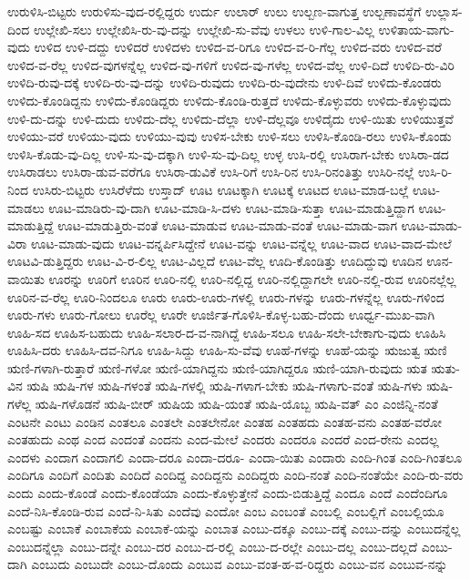 {ಉರುಳಿಸಿ-ಬಿಟ್ಟರು
ಉರುಳಿಸು-ವುದ-ರಲ್ಲಿದ್ದರು
ಉರ್ದು
ಉಲಾರ್
ಉಲು
ಉಲ್ಬಣ-ವಾಗುತ್ತ
ಉಲ್ಬಣಾವಸ್ಥೆಗೆ
ಉಲ್ಲಾಸ-ದಿಂದ
ಉಲ್ಲೇಖಿ-ಸಲು
ಉಲ್ಲೇಖಿಸಿ-ರು-ವು-ದನ್ನು
ಉಲ್ಲೇಖಿ-ಸು-ವೆವು
ಉಳಲು
ಉಳಿ-ಗಾಲ-ವಿಲ್ಲ
ಉಳಿತಾಯ-ವಾಗು-ವುದು
ಉಳಿದ
ಉಳಿ-ದದ್ದು
ಉಳಿದರೆ
ಉಳಿದಳು
ಉಳಿದ-ವ-ರಿಗೂ
ಉಳಿದ-ವ-ರಿ-ಗೆಲ್ಲ
ಉಳಿದ-ವರು
ಉಳಿದ-ವರೆ
ಉಳಿದ-ವ-ರೆಲ್ಲ
ಉಳಿದ-ವುಗಳನ್ನೆಲ್ಲ
ಉಳಿದ-ವು-ಗಳಿಗೆ
ಉಳಿದ-ವು-ಗಳೆಲ್ಲ
ಉಳಿದ-ವೆಲ್ಲ
ಉಳಿ-ದಿದೆ
ಉಳಿದಿ-ರು-ವಿರಿ
ಉಳಿದಿ-ರುವು-ದಕ್ಕೆ
ಉಳಿದಿ-ರು-ವು-ದನ್ನು
ಉಳಿದಿ-ರುವುದು
ಉಳಿದಿ-ರು-ವುದೇನು
ಉಳಿ-ದಿವೆ
ಉಳಿದು-ಕೊಂಡರು
ಉಳಿದು-ಕೊಂಡಿದ್ದನು
ಉಳಿದು-ಕೊಂಡಿದ್ದರು
ಉಳಿದು-ಕೊಂಡಿ-ರುತ್ತದೆ
ಉಳಿದು-ಕೊಳ್ಳುವರು
ಉಳಿದು-ಕೊಳ್ಳುವುದು
ಉಳಿ-ದು-ದನ್ನು
ಉಳಿ-ದುದು
ಉಳಿದು-ದೆಲ್ಲ
ಉಳಿದು-ದೆಲ್ಲಾ
ಉಳಿ-ದೆಲ್ಲವೂ
ಉಳಿದೈದು
ಉಳಿ-ಯಿತು
ಉಳಿಯುತ್ತವೆ
ಉಳಿಯು-ವರೆ
ಉಳಿಯು-ವುದು
ಉಳಿಯು-ವುವು
ಉಳಿಸ-ಬೇಕು
ಉಳಿ-ಸಲು
ಉಳಿಸಿ-ಕೊಂಡಿ-ರಲು
ಉಳಿಸಿ-ಕೊಂಡು
ಉಳಿಸಿ-ಕೊಡು-ವು-ದಿಲ್ಲ
ಉಳಿ-ಸು-ವು-ದಕ್ಕಾಗಿ
ಉಳಿ-ಸು-ವು-ದಿಲ್ಲ
ಉಳ್ಳ
ಉಸಿ-ರಲ್ಲಿ
ಉಸಿರಾಗ-ಬೇಕು
ಉಸಿರಾ-ಡದ
ಉಸಿರಾಡಲು
ಉಸಿರಾ-ಡುವ-ವರೆಗೂ
ಉಸಿರಾ-ಡುವಿಕೆ
ಉಸಿ-ರಿಗೆ
ಉಸಿ-ರಿನ
ಉಸಿ-ರಿನಂತಿತ್ತು
ಉಸಿರಿ-ನಲ್ಲೆ
ಉಸಿ-ರಿ-ನಿಂದ
ಉಸಿರು-ಬಿಟ್ಟರು
ಉಸಿರೆಳೆದು
ಉಸ್ತಾದ್
ಊಟ
ಊಟಕ್ಕಾಗಿ
ಊಟಕ್ಕೆ
ಊಟದ
ಊಟ-ಮಾಡ-ಬಲ್ಲೆ
ಊಟ-ಮಾಡಲು
ಊಟ-ಮಾಡಿರು-ವು-ದಾಗಿ
ಊಟ-ಮಾಡಿ-ಸಿ-ದಳು
ಊಟ-ಮಾಡಿ-ಸುತ್ತಾ
ಊಟ-ಮಾಡುತ್ತಿದ್ದಾಗ
ಊಟ-ಮಾಡುತ್ತಿದ್ದೆ
ಊಟ-ಮಾಡುತ್ತಿರು-ವಂತೆ
ಊಟ-ಮಾಡುವ
ಊಟ-ಮಾಡು-ವಂತೆ
ಊಟ-ಮಾಡು-ವಾಗ
ಊಟ-ಮಾಡು-ವಿರಾ
ಊಟ-ಮಾಡು-ವುದು
ಊಟ-ವನ್ನರ್ಪಿಸಿದ್ದೇನೆ
ಊಟ-ವನ್ನು
ಊಟ-ವನ್ನೆಲ್ಲ
ಊಟ-ವಾದ
ಊಟ-ವಾದ-ಮೇಲೆ
ಊಟವಿ-ಡುತ್ತಿದ್ದರು
ಊಟ-ವಿ-ರ-ಲಿಲ್ಲ
ಊಟ-ವಿಲ್ಲದೆ
ಊಟ-ವೆಲ್ಲ
ಊದಿ-ಕೊಂಡಿತ್ತು
ಊದಿದ್ದುವು
ಊದಿನ
ಊನ-ವಾಯಿತು
ಊರನ್ನು
ಊರಿಗೆ
ಊರಿನ
ಊರಿ-ನಲ್ಲಿ
ಊರಿ-ನಲ್ಲಿದ್ದ
ಊರಿ-ನಲ್ಲಿದ್ದಾಗಲೇ
ಊರಿ-ನಲ್ಲಿ-ರುವ
ಊರಿನಲ್ಲೆಲ್ಲ
ಊರಿನ-ವ-ರೆಲ್ಲ
ಊರಿ-ನಿಂದಲೂ
ಊರು
ಊರು-ಊರು-ಗಳಲ್ಲಿ
ಊರು-ಗಳನ್ನು
ಊರು-ಗಳನ್ನೆಲ್ಲ
ಊರು-ಗಳಿಂದ
ಊರು-ಗಳು
ಊರು-ಗೋಲು
ಊರೆಲ್ಲ
ಊರೇ
ಊರ್ಜಿತ-ಗೊಳಿಸಿ-ಕೊಳ್ಳ-ಬಹು-ದೆಂದು
ಊರ್ಧ್ವ-ಮುಖ-ವಾಗಿ
ಊಹಿ-ಸದ
ಊಹಿಸ-ಬಹುದು
ಊಹಿ-ಸಲಾರ-ದ-ವ-ನಾಗಿದ್ದೆ
ಊಹಿ-ಸಲೂ
ಊಹಿ-ಸಲೇ-ಬೇಕಾಗು-ವುದು
ಊಹಿಸಿ
ಊಹಿಸಿ-ದರು
ಊಹಿಸಿ-ದವ-ನಿಗೂ
ಊಹಿ-ಸಿದ್ದು
ಊಹಿ-ಸು-ವೆವು
ಊಹೆ-ಗಳನ್ನು
ಊಹೆ-ಯನ್ನು
ಋಜುತ್ವ
ಋಣಿ
ಋಣಿ-ಗಳಾಗಿ-ರುತ್ತಾರೆ
ಋಣಿ-ಗಳೋ
ಋಣಿ-ಯಾಗಿದ್ದನು
ಋಣಿ-ಯಾಗಿದ್ದರೂ
ಋಣಿ-ಯಾಗಿ-ರುವುದು
ಋತ
ಋತು-ವಿನ
ಋಷಿ
ಋಷಿ-ಗಳ
ಋಷಿ-ಗಳಂತೆ
ಋಷಿ-ಗಳಲ್ಲಿ
ಋಷಿ-ಗಳಾಗ-ಬೇಕು
ಋಷಿ-ಗಳಾಗು-ವಂತೆ
ಋಷಿ-ಗಳು
ಋಷಿ-ಗಳೆಲ್ಲ
ಋಷಿ-ಗಳೊಡನೆ
ಋಷಿ-ಬೀರ್
ಋಷಿಯ
ಋಷಿ-ಯಂತೆ
ಋಷಿ-ಯೊಬ್ಬ
ಋಷಿ-ವತ್
ಎಂ
ಎಂಜಿನ್ನಿ-ನಂತೆ
ಎಂಟನೇ
ಎಂಟು
ಎಂಡಿನ
ಎಂತಲೂ
ಎಂತಲೇ
ಎಂತಲೇನೋ
ಎಂತಹ
ಎಂತಹದು
ಎಂತಹ-ವನು
ಎಂತಹ-ವರೋ
ಎಂತಹುದು
ಎಂಥ
ಎಂದ
ಎಂದಂತೆ
ಎಂದನು
ಎಂದ-ಮೇಲೆ
ಎಂದರು
ಎಂದರೂ
ಎಂದರೆ
ಎಂದ-ರೇನು
ಎಂದಲ್ಲ
ಎಂದಳು
ಎಂದಾಗ
ಎಂದಾಗಲಿ
ಎಂದಾ-ದರೂ
ಎಂದಾ-ದರೂ-
ಎಂದಾ-ಯಿತು
ಎಂದಾರು
ಎಂದಿ-ಗಿಂತ
ಎಂದಿ-ಗಿಂತಲೂ
ಎಂದಿಗೂ
ಎಂದಿಗೆ
ಎಂದಿತು
ಎಂದಿದೆ
ಎಂದಿದ್ದ
ಎಂದಿದ್ದನು
ಎಂದಿದ್ದರು
ಎಂದಿ-ನಂತೆ
ಎಂದಿ-ನಂತೆಯೇ
ಎಂದಿ-ರು-ವರು
ಎಂದು
ಎಂದು-ಕೊಂಡೆ
ಎಂದು-ಕೊಂಡೆಯಾ
ಎಂದು-ಕೊಳ್ಳುತ್ತೇನೆ
ಎಂದು-ಬಿಡುತ್ತಿದ್ದೆ
ಎಂದೂ
ಎಂದೆ
ಎಂದೆಂದಿಗೂ
ಎಂದೆ-ನಿಸಿ-ಕೊಂಡಿ-ರುವ
ಎಂದೆ-ನಿ-ಸಿತು
ಎಂದೆವು
ಎಂದೋ
ಎಂಬ
ಎಂಬಂತೆ
ಎಂಬಲ್ಲಿ
ಎಂಬಲ್ಲಿಗೆ
ಎಂಬಲ್ಲಿಯೂ
ಎಂಬಷ್ಟು
ಎಂಬಾಕೆ
ಎಂಬಾಕೆಯ
ಎಂಬಾಕೆ-ಯನ್ನು
ಎಂಬಾತ
ಎಂಬು-ದಕ್ಕೂ
ಎಂಬು-ದಕ್ಕೆ
ಎಂಬು-ದನ್ನು
ಎಂಬುದನ್ನೆಲ್ಲ
ಎಂಬುದನ್ನೆಲ್ಲಾ
ಎಂಬು-ದನ್ನೇ
ಎಂಬು-ದರ
ಎಂಬು-ದ-ರಲ್ಲಿ
ಎಂಬು-ದ-ರಲ್ಲೇ
ಎಂಬು-ದಲ್ಲ
ಎಂಬು-ದಲ್ಲದೆ
ಎಂಬು-ದಾಗಿ
ಎಂಬುದು
ಎಂಬುದೇ
ಎಂಬು-ದೊಂದು
ಎಂಬುವ
ಎಂಬು-ವಂತ-ಹ-ವ-ರಿದ್ದರು
ಎಂಬು-ವನ
ಎಂಬುವ-ನನ್ನು
}
